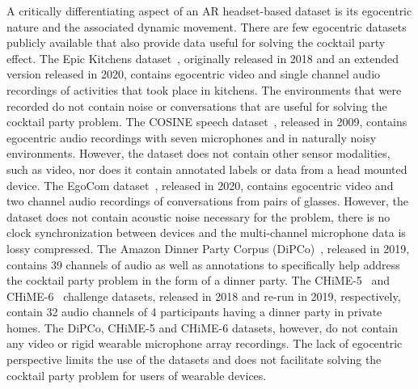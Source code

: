 \documentclass[journal]{IEEEtran}
\begin{document}
A critically differentiating aspect of an AR headset-based dataset is its egocentric nature and the associated dynamic movement.
There are few egocentric datasets publicly available that also provide data useful for solving the cocktail party effect.
The Epic Kitchens dataset~\cite{Damen2018EPICKITCHENS,damen2020rescaling}, originally released in 2018 and an extended version released in 2020, contains egocentric video and single channel audio recordings of activities that took place in kitchens.
The environments that were recorded do not contain noise or conversations that are useful for solving the cocktail party problem.
The COSINE speech dataset~\cite{stupakov2009cosine}, released in 2009, contains egocentric audio recordings with seven microphones and in naturally noisy environments.
However, the dataset does not contain other sensor modalities, such as video, nor does it contain annotated labels or data from a head mounted device.
The EgoCom dataset~\cite{northcutt2020egocom}, released in 2020, contains egocentric video and two channel audio recordings of conversations from pairs of glasses.
However, the dataset does not contain acoustic noise necessary for the problem, there is no clock synchronization between devices and the multi-channel microphone data is lossy compressed.
The Amazon Dinner Party Corpus (DiPCo)~\cite{vansegbroeck2019dipco}, released in 2019, contains 39 channels of audio as well as annotations to specifically help address the cocktail party problem in the form of a dinner party.
The CHiME-5~\cite{barker2018fifth} and CHiME-6~\cite{watanabe2020chime6} challenge datasets, released in 2018 and re-run in 2019, respectively, contain 32 audio channels of 4 participants having a dinner party in private homes.
The DiPCo, CHiME-5 and CHiME-6 datasets, however, do not contain any video or rigid wearable microphone array recordings.
The lack of egocentric perspective limits the use of the datasets and does not facilitate solving the cocktail party problem for users of wearable devices.


\setlength{\dashlinedash}{0.2pt}
\setlength{\dashlinegap}{1.5pt}
\setlength{\arrayrulewidth}{0.2pt}
\end{document}

